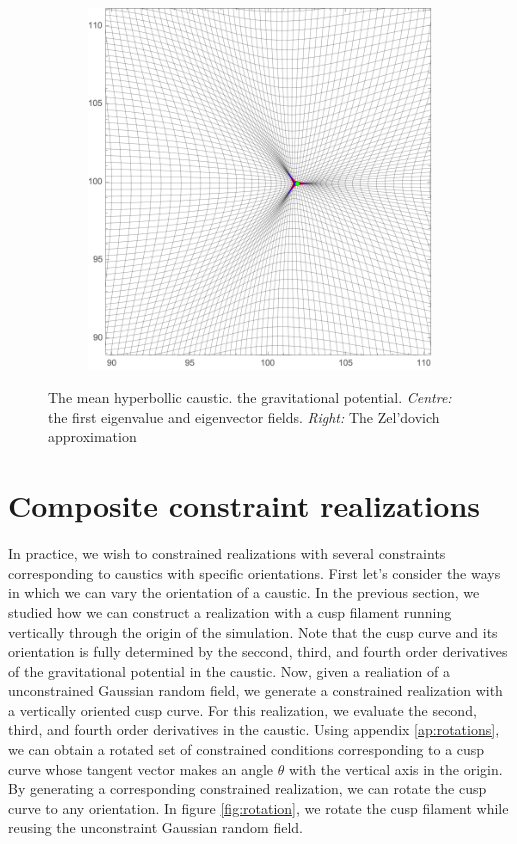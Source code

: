 \documentclass[a4paper, 11pt]{article}
\begin{document}
\begin{figure}
\begin{subfigure}[b]{0.32\textwidth}
\end{subfigure}~
\begin{subfigure}[b]{0.32\textwidth}
\includegraphics[width=\textwidth]{Hyperbollic_mean_Z}
\end{subfigure}
\caption{The mean hyperbollic caustic.  the gravitational potential. \textit{Centre:} the first eigenvalue and eigenvector fields. \textit{Right:} The Zel'dovich approximation}\label{fig:meanSwallowtail}
\end{figure}


\section{Composite constraint realizations}
In practice, we wish to constrained realizations with several constraints corresponding to caustics with specific orientations. First let's consider the ways in which we can vary the orientation of a caustic. In the previous section, we studied how we can construct a realization with a cusp filament running vertically through the origin of the simulation. Note that the cusp curve and its orientation is fully determined by the seccond, third, and fourth order derivatives of the gravitational potential in the caustic. Now, given a realiation of a unconstrained Gaussian random field, we generate a constrained realization with a vertically oriented cusp curve. For this realization, we evaluate the second, third, and fourth order derivatives in the caustic. Using appendix \ref{ap:rotations}, we can obtain a rotated set of constrained conditions corresponding to a cusp curve whose tangent vector makes an angle $\theta$ with the vertical axis in the origin. By generating a corresponding constrained realization, we can rotate the cusp curve to any orientation. In figure \ref{fig:rotation}, we rotate the cusp filament while reusing the unconstraint Gaussian random field.
\end{document}
